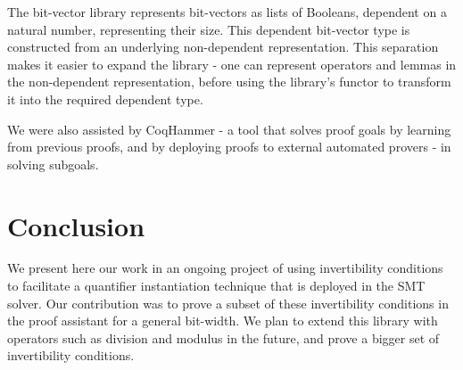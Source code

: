 \documentclass[10pt,conference]{IEEEtran}
\begin{document}
The bit-vector library represents bit-vectors as 
lists of Booleans, dependent on a natural number, 
representing their size. This dependent bit-vector 
type is constructed from an underlying non-dependent 
representation. This separation makes it easier to 
expand the library - one can represent operators 
and lemmas in the non-dependent representation, 
before using the library's functor to transform it 
into the required dependent type. 

We were also assisted by CoqHammer - a tool that 
solves proof goals by learning from previous proofs, 
and by deploying proofs to external automated provers
 - in solving subgoals.
 
\section{Conclusion}
\label{conc}
 We present here our work in an ongoing 
project of using invertibility conditions to facilitate a 
quantifier instantiation technique that is deployed in 
the \cvcfour SMT solver. Our contribution was to 
prove a subset of these invertibility conditions in the 
\coq proof assistant for a general bit-width. We plan 
to extend this library with operators such as division and 
modulus in the future, and prove a bigger set of invertibility conditions. 


%
%
%
%



\end{document}
